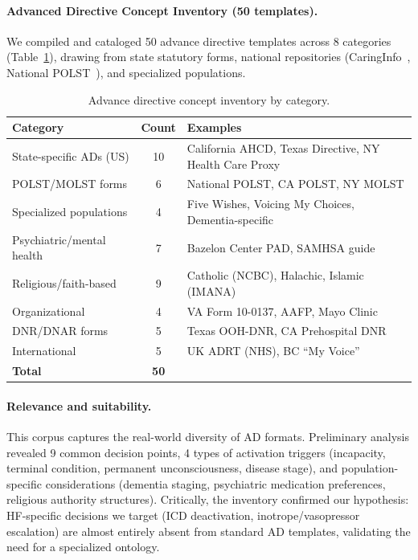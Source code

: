 \documentclass[11pt]{article}
\begin{document}
\paragraph{Advanced Directive Concept Inventory (50 templates).}
We compiled and cataloged 50 advance directive templates across 8 categories (Table~\ref{tab:inventory}), drawing from state statutory forms, national repositories (CaringInfo~\cite{caringinfo}, National POLST~\cite{polst}), and specialized populations.

\begin{table}[ht]
\centering
\caption{Advance directive concept inventory by category.}
\label{tab:inventory}
\begin{tabularx}{\textwidth}{Xc>{\raggedright\arraybackslash}X}
\toprule
\textbf{Category} & \textbf{Count} & \textbf{Examples} \\
\midrule
State-specific ADs (US) & 10 & California AHCD, Texas Directive, NY Health Care Proxy \\
POLST/MOLST forms & 6 & National POLST, CA POLST, NY MOLST \\
Specialized populations & 4 & Five Wishes, Voicing My Choices, Dementia-specific \\
Psychiatric/mental health & 7 & Bazelon Center PAD, SAMHSA guide \\
Religious/faith-based & 9 & Catholic (NCBC), Halachic, Islamic (IMANA) \\
Organizational & 4 & VA Form 10-0137, AAFP, Mayo Clinic \\
DNR/DNAR forms & 5 & Texas OOH-DNR, CA Prehospital DNR \\
International & 5 & UK ADRT (NHS), BC ``My Voice'' \\
\midrule
\textbf{Total} & \textbf{50} & \\
\bottomrule
\end{tabularx}
\end{table}

\paragraph{Relevance and suitability.}
This corpus captures the real-world diversity of AD formats. Preliminary analysis revealed 9 common decision points, 4 types of activation triggers (incapacity, terminal condition, permanent unconsciousness, disease stage), and population-specific considerations (dementia staging, psychiatric medication preferences, religious authority structures). Critically, the inventory confirmed our hypothesis: HF-specific decisions we target (ICD deactivation, inotrope/vasopressor escalation) are almost entirely absent from standard AD templates, validating the need for a specialized ontology.
\end{document}

